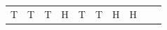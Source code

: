 {\begin{tabular}[t]{|l|l|l|l|l|l|l|l|l|l|}
    
        T &
    
    
        T &
    
    
        T &
    
    
        H &
    
    
        T &
    
    
        T &
    
    
        H &
    
    
        H%
     \tabularnewline\cline{1-1}\cline{2-2}\cline{3-3}\cline{4-4}\cline{5-5}\cline{6-6}\cline{7-7}\cline{8-8}\cline{9-9}\cline{10-10}
    
    

\end{tabular}}
